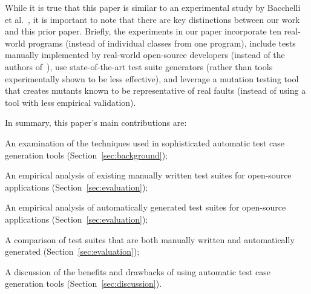 
While it is true that this paper is similar to an experimental study by Bacchelli et al.~\cite{bacchelli2008}, it is important to note that there are key distinctions between our work and this prior paper.  Briefly, the experiments in our paper incorporate ten real-world programs (instead of individual classes from one program), include tests manually implemented by real-world open-source developers (instead of the authors of~\cite{bacchelli2008}), use state-of-the-art test suite generators (rather than tools experimentally shown to be less effective), and leverage a mutation testing tool that creates mutants known to be representative of real faults (instead of using a tool with less empirical validation).  




In summary, this paper's main contributions are:
\squishlist 
\item An examination of the techniques used in sophisticated automatic test case generation tools (Section~\ref{sec:background});

\item An empirical analysis of existing manually written test suites for open-source applications (Section~\ref{sec:evaluation});

\item An empirical analysis of automatically generated test suites for open-source applications (Section~\ref{sec:evaluation});

\item A comparison of test suites that are both manually written and automatically generated (Section~\ref{sec:evaluation});

\item A discussion of the benefits and drawbacks of using automatic test case generation tools (Section~\ref{sec:discussion}).

\squishend 

